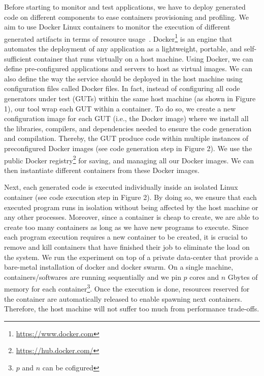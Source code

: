 Before starting to monitor and test applications, we have to deploy generated code on different components to ease containers provisioning and profiling. 
We aim to use Docker Linux containers to monitor the execution of different generated artifacts in terms of resource usage~\cite{merkel2014docker}. 
Docker\footnote{\url{https://www.docker.com}} is an engine that automates the deployment of any application as a lightweight, portable, and self-sufficient container that runs virtually on a host machine. 
Using Docker, we can define pre-configured applications and servers to host as virtual images. We can also define the way the service should be deployed in the host machine using configuration files called Docker files. 
In fact, instead of configuring all code generators under test (GUTs) within the same host machine (as shown in Figure 1), our tool wrap each GUT within a container. To do so, we create a new configuration image for each GUT (i.e., the Docker image) where we install all the libraries, compilers, and dependencies needed to ensure the code generation and compilation. Thereby, the GUT produce code within multiple instances of preconfigured Docker images (see code generation step in Figure 2).
We use the public Docker registry\footnote{\url{https://hub.docker.com/}} for  saving, and managing all our Docker images. 
We can then instantiate different containers from these Docker images. 

Next, each generated code is executed individually inside an isolated Linux container (see code execution step in Figure 2). By doing so, we ensure that each executed program runs in isolation without being affected by the host machine or any other processes. Moreover, since a container is cheap to create, we are able to create too many containers as long as we have new programs to execute.  
Since each program execution requires a new container to be created, it is crucial to remove and kill containers that have finished their job to eliminate the load on the system. We run the experiment on top of a private data-center that provide a bare-metal installation of  docker and docker swarm. On a single machine,  containers/softwares are running sequentially and we pin $p$ cores and $n$ Gbytes of memory for each container\footnote{$p$ and $n$ can be cofigured}. Once the execution is done, resources reserved for the container are automatically released to enable spawning next containers. Therefore, the host machine will not suffer too much from performance trade-offs.

